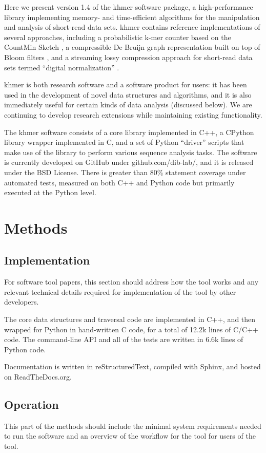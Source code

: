 \documentclass[10pt,a4paper,twocolumn]{article}
\begin{document}
Here we present version 1.4 of the khmer software package, a
high-performance library implementing memory- and time-efficient
algorithms for the manipulation and analysis of short-read data sets.  khmer
contains reference implementations of several approaches, including a
probabilistic k-mer counter based on the CountMin Sketch \cite{Zhang2013}, a
compressible De Bruijn graph representation built on top of Bloom
filters \cite{Pell2012}, and a streaming lossy compression approach for
short-read data sets termed ``digital normalization'' \cite{Brown2012}.

khmer is both research software and a software product for users: it
has been used in the development of novel data structures and
algorithms, and it is also immediately useful for certain kinds of
data analysis (discussed below).  We are continuing to develop research
extensions while maintaining existing functionality.

The khmer software consists of a core library implemented in C++, a
CPython library wrapper implemented in C, and a set of Python
``driver'' scripts that make use of the library to perform various
sequence analysis tasks.  The software is currently developed on
GitHub under github.com/dib-lab/, and it is released under the BSD
License.  There is greater than 80\% statement coverage under
automated tests, measured on both C++ and Python code but primarily
executed at the Python level.

\section*{Methods}
\subsection*{Implementation}
For software tool papers, this section should address how the tool works and any relevant technical details required for implementation of the tool by other developers.  

The core data structures and traversal code are implemented in C++, and
then wrapped for Python in hand-written C code, for a total of
12.2k lines of C/C++ code.  The command-line API and all of the tests
are written in 6.6k lines of Python code.

Documentation is written in reStructuredText, compiled with Sphinx, and hosted on ReadTheDocs.org.

\subsection*{Operation}
This part of the methods should include the minimal system requirements needed to run the software and an overview of the workflow for the tool for users of the tool.
\end{document}
